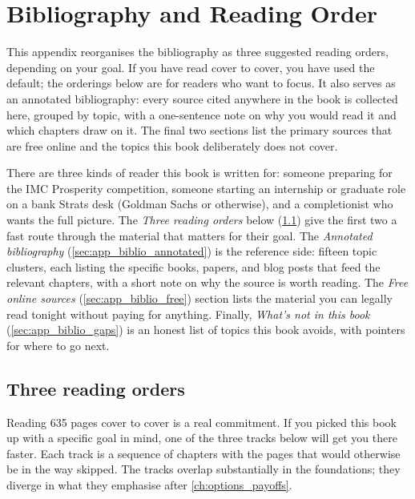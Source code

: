 \chapter{Bibliography and Reading Order}
\label{ch:app_biblio}

This appendix reorganises the bibliography as three suggested reading
orders, depending on your goal. If you have read cover to cover, you
have used the default; the orderings below are for readers who want to
focus. It also serves as an annotated bibliography: every source cited
anywhere in the book is collected here, grouped by topic, with a
one-sentence note on why you would read it and which chapters draw on
it. The final two sections list the primary sources that are free
online and the topics this book deliberately does not cover.

\begin{backgroundbox}
There are three kinds of reader this book is written for: someone
preparing for the IMC Prosperity competition, someone starting an
internship or graduate role on a bank Strats desk (Goldman Sachs or
otherwise), and a completionist who wants the full picture. The
\emph{Three reading orders} below (\cref{sec:app_biblio_tracks}) give
the first two a fast route through the material that matters for their
goal. The \emph{Annotated bibliography}
(\cref{sec:app_biblio_annotated}) is the reference side: fifteen
topic clusters, each listing the specific books, papers, and blog
posts that feed the relevant chapters, with a short note on why the
source is worth reading. The \emph{Free online sources}
(\cref{sec:app_biblio_free}) section lists the material you can legally
read tonight without paying for anything. Finally,
\emph{What's not in this book} (\cref{sec:app_biblio_gaps}) is an
honest list of topics this book avoids, with pointers for where to go
next.
\end{backgroundbox}

\section{Three reading orders}
\label{sec:app_biblio_tracks}

Reading 635 pages cover to cover is a real commitment. If you picked
this book up with a specific goal in mind, one of the three tracks
below will get you there faster. Each track is a sequence of chapters
with the pages that would otherwise be in the way skipped. The tracks
overlap substantially in the foundations; they diverge in what they
emphasise after \cref{ch:options_payoffs}.

